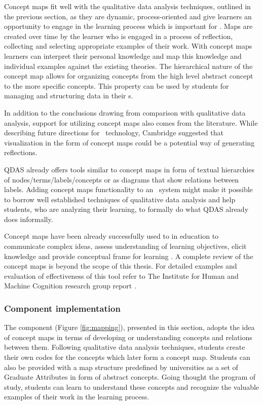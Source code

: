 Concept maps fit well with the qualitative data analysis techniques, outlined in
the previous section, as they are dynamic, process-oriented and give learners an
opportunity to engage in the learning process \citep{Mcaleese1998} which is
important for \LLLs \citep{Schuetze2006,Divjak2004}. Maps are created over time
by the learner who is engaged in a process of reflection, collecting and
selecting appropriate examples of their work. With concept maps learners can
interpret their personal knowledge and map this knowledge and individual
examples against the existing theories. The hierarchical nature of the concept
map allows for organizing concepts from the high level abstract concept to the
more specific concepts. This property can be used by students for managing and
structuring data in their \ep s. 

In addition to the conclusions drawing from comparison with qualitative data
analysis, support for utilizing concept maps also comes from the literature.
While describing future directions for \ep~technology, Cambridge
\citeyearpar{Cambridge2010} suggested that visualization in the form of concept
maps could be a potential way of generating reflections.

QDAS already offers tools similar to concept maps in form of textual hierarchies
of nodes/terms/labels/concepts or as diagrams that show relations between
labels. Adding concept maps functionality to an \ep~system might make it
possible to borrow well established techniques of qualitative data analysis and
help students, who are analyzing their learning, to formally do what QDAS
already does informally. 

Concept maps have been already successfully used to in education to communicate
complex ideas, assess understanding of learning objectives, elicit knowledge and
provide conceptual frame for learning \citep{Novak2010}. A complete review of
the concept maps is beyond the scope of this thesis. For detailed examples and
evaluation of effectiveness of this tool refer to The Institute for Human and
Machine Cognition research group report \citep{Canas2003}.

\subsubsection{Component implementation}

The component (Figure \ref{fig:mapping}), presented in this section, adopts the
idea of concept maps in terms of developing or understanding concepts and
relations between them. Following qualitative data analysis techniques, students
create their own codes for the concepts which later form a concept map. Students
can also be provided with a map structure predefined by universities as a set of
Graduate Attributes in form of abstract concepts. Going thought the program of
study, students can learn to understand these concepts and recognize the
valuable examples of their work in the learning process.

